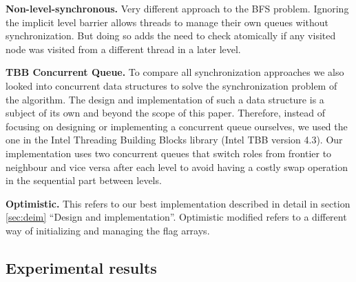\documentclass[letterpaper]{article}
\newcommand{\mypar}[1]{{\bf #1.}} %
\begin{document}
		\mypar{Non-level-synchronous}
		Very different approach to the BFS problem. Ignoring the implicit level barrier allows threads to manage their own queues without synchronization. But doing so adds the need to check atomically if any visited node was visited from a different thread in a later level.


		\mypar{TBB Concurrent Queue}
		To compare all synchronization approaches we also looked into concurrent data structures to solve the synchronization problem of the algorithm.
		The design and implementation of such a data structure is a subject of its own and beyond the scope of this paper. Therefore, instead of focusing on designing or implementing a concurrent queue ourselves, we used the one in the Intel Threading Building Blocks library (Intel TBB version 4.3).
		Our implementation uses two concurrent queues that switch roles from frontier to neighbour and vice versa after each level to avoid having a costly swap operation in the sequential part between levels.

		\mypar{Optimistic}
		This refers to our best implementation described in detail in section \ref{sec:deim} ``Design and implementation''.
		Optimistic modified refers to a different way of initializing and managing the flag arrays.



	\subsection{Experimental results}
\end{document}

